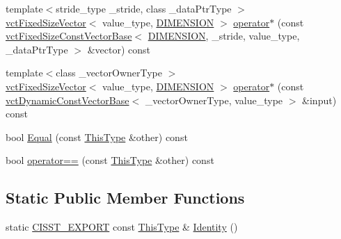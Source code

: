 {\bf }\par
\begin{DoxyCompactItemize}
\item 
{\footnotesize template$<$stride\+\_\+type \+\_\+stride, class \+\_\+data\+Ptr\+Type $>$ }\\\hyperlink{classvct_fixed_size_vector}{vct\+Fixed\+Size\+Vector}$<$ value\+\_\+type, \hyperlink{classvct_frame_base_a4284a4e875533c13df90a20c0233e043ad25b85efd5e4c2687ddf38ae18cd88f0}{D\+I\+M\+E\+N\+S\+I\+O\+N} $>$ \hyperlink{classvct_frame_base_a695b087db328cf88f2e7fd6b9340a0f4}{operator$\ast$} (const \hyperlink{classvct_fixed_size_const_vector_base}{vct\+Fixed\+Size\+Const\+Vector\+Base}$<$ \hyperlink{classvct_frame_base_a4284a4e875533c13df90a20c0233e043ad25b85efd5e4c2687ddf38ae18cd88f0}{D\+I\+M\+E\+N\+S\+I\+O\+N}, \+\_\+stride, value\+\_\+type, \+\_\+data\+Ptr\+Type $>$ \&vector) const 
\item 
{\footnotesize template$<$class \+\_\+vector\+Owner\+Type $>$ }\\\hyperlink{classvct_fixed_size_vector}{vct\+Fixed\+Size\+Vector}$<$ value\+\_\+type, \hyperlink{classvct_frame_base_a4284a4e875533c13df90a20c0233e043ad25b85efd5e4c2687ddf38ae18cd88f0}{D\+I\+M\+E\+N\+S\+I\+O\+N} $>$ \hyperlink{classvct_frame_base_af220c27b4b9834ca0af5483cf6b37fca}{operator$\ast$} (const \hyperlink{classvct_dynamic_const_vector_base}{vct\+Dynamic\+Const\+Vector\+Base}$<$ \+\_\+vector\+Owner\+Type, value\+\_\+type $>$ \&input) const 
\end{DoxyCompactItemize}

{\bf }\par
\begin{DoxyCompactItemize}
\item 
bool \hyperlink{classvct_frame_base_a2917142640685587e1382b51c6df8a21}{Equal} (const \hyperlink{classvct_frame_base_a076f1fe4fc957faa0d1ff7450d1cb768}{This\+Type} \&other) const 
\item 
bool \hyperlink{classvct_frame_base_acd0790eec08a99bcd5c50465509d171f}{operator==} (const \hyperlink{classvct_frame_base_a076f1fe4fc957faa0d1ff7450d1cb768}{This\+Type} \&other) const 
\end{DoxyCompactItemize}

\subsection*{Static Public Member Functions}
\begin{DoxyCompactItemize}
\item 
static \hyperlink{cmn_export_macros_8h_a99393e0c3ac434b2605235bbe20684f8}{C\+I\+S\+S\+T\+\_\+\+E\+X\+P\+O\+R\+T} const \hyperlink{classvct_frame_base_a076f1fe4fc957faa0d1ff7450d1cb768}{This\+Type} \& \hyperlink{classvct_frame_base_a75cf198b35e4b782326105a1aa414a25}{Identity} ()
\end{DoxyCompactItemize}
